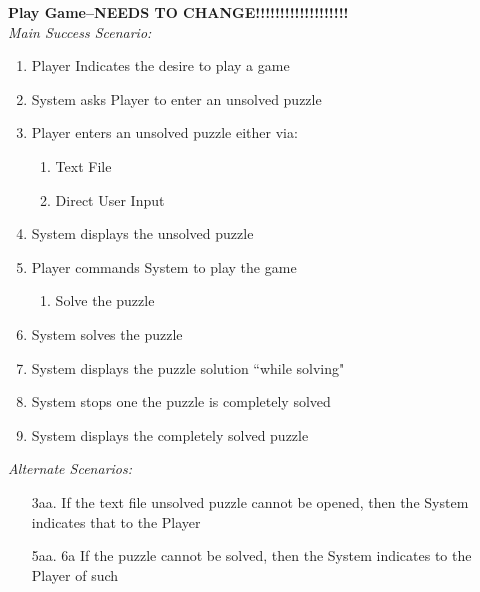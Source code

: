 \documentclass[letterpaper]{article}
\begin{document}
\noindent
\textbf{Play Game--NEEDS TO CHANGE!!!!!!!!!!!!!!!!!!!}\\
\textit{Main Success Scenario:}
\begin{enumerate}
\item Player Indicates the desire to play a game
\item System asks Player to enter an unsolved puzzle
\item Player enters an unsolved puzzle either via:
\begin{enumerate}
\item Text File
\item Direct User Input
\end{enumerate}
\item System displays the unsolved puzzle
\item Player commands System to play the game
\begin{enumerate}
\item Solve the puzzle
\end{enumerate}
\item System solves the puzzle
\item System displays the puzzle solution ``while solving"
\item System stops one the puzzle is completely solved
\item System displays the completely solved puzzle
\end{enumerate}
\textit{Alternate Scenarios:}
\begin{enumerate}
\item[3aa.] If the text file unsolved puzzle cannot be opened, then
        the System indicates that to the Player
\item[5aa. 6a] If the puzzle cannot be solved, then the System
        indicates to the Player of such
\end{enumerate}
\end{document}
